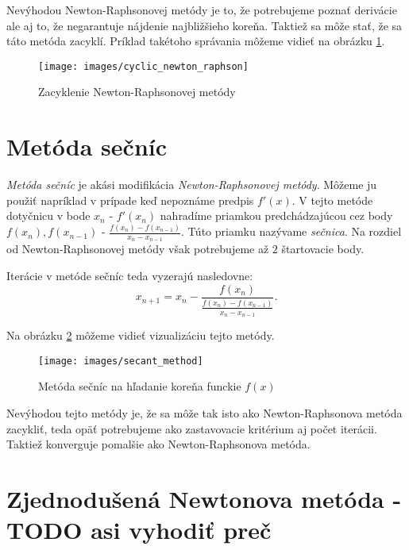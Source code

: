 Nevýhodou Newton-Raphsonovej metódy je to, že potrebujeme poznať derivácie ale aj to, že negarantuje nájdenie
najbližšieho koreňa. Taktiež sa môže stať, že sa táto metóda zacyklí. Príklad takétoho správania môžeme vidieť
na obrázku \ref{obr:cyclic_newton_raphson}.

\begin{figure}
    \centerline{\texttt{[image: images/cyclic\_newton\_raphson]}}
    \caption[Zacyklenie Newton-Raphsonovej metódy]{Zacyklenie Newton-Raphsonovej metódy}
    \label{obr:cyclic_newton_raphson}
\end{figure}

\section{Metóda sečníc}

\textit{Metóda sečníc} je akási modifikácia \textit{Newton-Raphsonovej metódy}. 
Môžeme ju použiť napríklad v prípade keď nepoznáme predpis $f'(x)$. 
V tejto metóde dotyčnicu v bode $x_n$ - $f'(x_n)$ nahradíme priamkou 
predchádzajúcou cez body $f(x_n), f(x_{n-1})$ - $\frac{f(x_n) - f(x_{n-1})}{x_n - x_{n-1}}$. 
Túto priamku nazývame \textit{sečnica}. 
Na rozdiel od Newton-Raphsonovej metódy však potrebujeme až $2$ štartovacie body.

Iterácie v metóde sečníc teda vyzerajú nasledovne:
$$ x_{n+1} = x_n - \frac{f(x_n)}{\frac{f(x_n) - f(x_{n-1})}{x_n - x_{n-1}}}.$$

Na obrázku \ref{obr:secant_method} môžeme vidieť vizualizáciu tejto metódy.

\begin{figure}
    \centerline{\texttt{[image: images/secant\_method]}}
    \caption[Metóda sečníc na hľadanie koreňa funckie $f(x)$]{Metóda sečníc na hľadanie koreňa funckie $f(x)$}
    \label{obr:secant_method}
\end{figure}

Nevýhodou tejto metódy je, že sa môže tak isto ako Newton-Raphsonova metóda zacykliť, teda 
opäť potrebujeme ako zastavovacie kritérium aj počet iterácii. Taktiež konverguje
pomalšie ako Newton-Raphsonova metóda.

\iffalse
\section{Zjednodušená Newtonova metóda - TODO asi vyhodiť preč}

